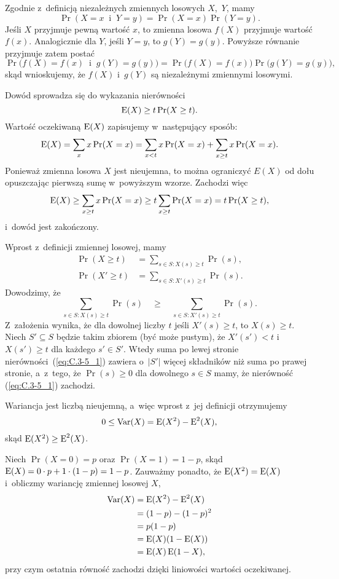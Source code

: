 \exercise{} %
Zgodnie z~definicją niezależnych zmiennych losowych $X$,~$Y$\!, mamy
\[
	\Pr(X=x\;\;\text{i}\;\;Y=y) = \Pr(X=x)\Pr(Y=y).
\]
Jeśli $X$ przyjmuje pewną wartość $x$, to zmienna losowa $f(X)$ przyjmuje wartość $f(x)$. Analogicznie dla $Y$\!, jeśli $Y=y$, to $g(Y)=g(y)$. Powyższe równanie przyjmuje zatem postać
\[
	\Pr\bigl(f(X)=f(x)\;\;\text{i}\;\;g(Y)=g(y)\bigr) = \Pr\bigl(f(X)=f(x)\bigr)\Pr\bigl(g(Y)=g(y)\bigr),
\]
skąd wnioskujemy, że $f(X)$ i~$g(Y)$ są niezależnymi zmiennymi losowymi.

\exercise{} %
Dowód sprowadza się do wykazania nierówności
\[
	\operatorname{E}(X) \ge t\Pr(X\ge t).
\]
Wartość oczekiwaną $\operatorname{E}(X)$ zapisujemy w~następujący sposób:
\[
    \operatorname{E}(X) = \sum_xx\Pr(X=x) = \sum_{x<t}x\Pr(X=x)+\sum_{x\ge t}x\Pr(X=x).
\]
Ponieważ zmienna losowa $X$ jest nieujemna, to można ograniczyć $E(X)$ od dołu opuszczając pierwszą sumę w~powyższym wzorze. Zachodzi więc
\[
    \operatorname{E}(X) \ge \sum_{x\ge t}x\Pr(X=x) \ge t\sum_{x\ge t}\Pr(X=x) = t\Pr(X\ge t),
\]
i~dowód jest zakończony.

\exercise{} %
Wprost z~definicji zmiennej losowej, mamy
\begin{align*}
	\Pr(X\ge t) &= \sum_{s\in S:X(s)\ge t}\Pr(s), \\
	\Pr(X'\ge t) &= \sum_{s\in S:X'(s)\ge t}\Pr(s).
\end{align*}
Dowodzimy, że
\[
	\sum_{s\in S:X(s)\ge t}\Pr(s)\quad \ge \quad\sum_{s\in S:X'(s)\ge t}\Pr(s). \tag{$*$}\label{eq:C.3-5_1}
\]
Z~założenia wynika, że dla dowolnej liczby $t$ jeśli $X'(s)\ge t$, to $X(s)\ge t$. Niech $S'\subseteq S$ będzie takim zbiorem (być może pustym), że $X'(s')<t$ i~$X(s')\ge t$ dla każdego $s'\in S'$. Wtedy suma po lewej stronie nierówności~(\ref{eq:C.3-5_1}) zawiera o~$|S'|$ więcej składników niż suma po prawej stronie, a~z~tego, że $\Pr(s)\ge0$ dla dowolnego $s\in S$ mamy, że nierówność (\ref{eq:C.3-5_1}) zachodzi.

\exercise{} %
Wariancja jest liczbą nieujemną, a~więc wprost z~jej definicji otrzymujemy
\[
	0 \le \operatorname{Var}(X) = \operatorname{E}(X^2)-\operatorname{E}^2(X),
\]
skąd $\operatorname{E}(X^2)\ge\operatorname{E}^2(X)$.

\exercise{} %
Niech $\Pr(X=0)=p$ oraz $\Pr(X=1)=1-p$, skąd $\operatorname{E}(X)=0\cdot p+1\cdot(1-p)=1-p$. Zauważmy ponadto, że $\operatorname{E}(X^2)=\operatorname{E}(X)$ i~obliczmy wariancję zmiennej losowej $X$,
\begin{align*}
	\operatorname{Var}(X) &= \operatorname{E}(X^2)-\operatorname{E}^2(X) \\
	&= (1-p)-(1-p)^2 \\
	&= p(1-p) \\
	&= \operatorname{E}(X)(1-\operatorname{E}(X)) \\
	&= \operatorname{E}(X)\operatorname{E}(1-X),
\end{align*}
przy czym ostatnia równość zachodzi dzięki liniowości wartości oczekiwanej.

